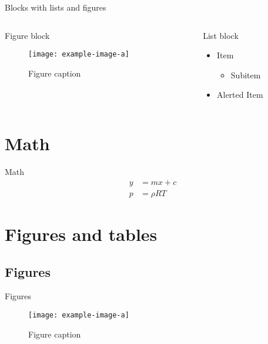 \begin{frame}{Blocks with lists and figures}
    \begin{columns}
        \begin{column}{0.45\linewidth}
            \begin{block}{Figure block}
                \begin{figure}
                    \texttt{[image: example-image-a]}
                    \caption{Figure caption}
                \end{figure}
            \end{block}
        \end{column}
        \begin{column}{0.45\linewidth}
            \begin{block}{List block}
                \begin{itemize}
                    \item Item
                    \begin{itemize}
                        \item Subitem
                    \end{itemize}
                    \item \alert{Alerted Item}
                \end{itemize}
            \end{block}
        \end{column}
    \end{columns}
\end{frame}

\section{Math}
\begin{frame}{Math}
    \begin{align}
        y &= mx + c\\
        p &= \rho R T
    \end{align}
\end{frame}

\section{Figures and tables}
\subsection{Figures}
\begin{frame}{Figures}
    \begin{figure}
        \texttt{[image: example-image-a]}
        \caption{Figure caption}
    \end{figure}
\end{frame}

